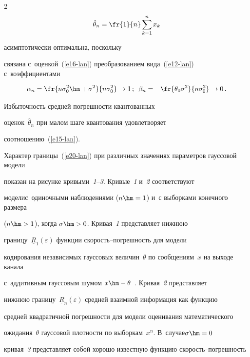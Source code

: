 \begin{multicols}{2}
$$


\hat{\theta}_n= \fr{1}{n} \sum\limits^n_{k=1} x_k


$$ 


асимптотически оптимальна, поскольку 


связана с~оценкой~(\ref{e16-lan}) преобразованием вида~(\ref{e12-lan}) с~коэффициентами 


$$


\alpha_n= \fr{n\sigma_0^2\hm+\sigma^2}{n\sigma_0^2} \to 1\,;


\enskip


\beta_n= -\fr{\theta_0\sigma^2}{n\sigma_0^2}\to 0\,.


$$


 Из\-бы\-точ\-ность сред\-ней по\-греш\-ности квантованных 


оценок~$\hat{\theta}_n$ при малом шаге квантования удовле\-тво\-ря\-ет  


соотношению~(\ref{e15-lan}).





Характер границы~(\ref{e20-lan}) при различных значениях параметров гауссовой модели 


показан на рисунке кривыми~\textit{1}--\textit{3}. Кривые~\textit{1} и~\textit{2} соответствуют 


модели\linebreak с~одиночными наблюдениями ($n\hm=1$) и~с выборками конечного размера 


($n\hm>1$), когда $\sigma\hm>0$. Кривая~\textit{1} представляет нижнюю 


границу~$\underline{R}_1(\varepsilon)$ функции ско\-рость--по\-греш\-ность для модели 


\mbox{кодирования} независимых гауссовых величин~$\theta$ по сообщениям~$x$ на выходе канала 


с~аддитивным гауссовым шумом $x\hm- \theta$~\cite{11-lan}. Кривая~\textit{2} представляет 


ниж\-нюю границу~$\underline{R}_n(\varepsilon)$ средней взаимной информация как функцию 


сред\-ней квад\-ра\-тич\-ной по\-греш\-ности для модели оценивания математического 


ожидания~$\theta$ гауссовой плот\-ности по выборкам~$x^n$. В~случае\linebreak $\sigma\hm=0$ 


кривая~\textit{3} пред\-став\-ля\-ет собой хорошо известную функцию ско\-рость--по\-греш\-ность 



\end{multicols}
